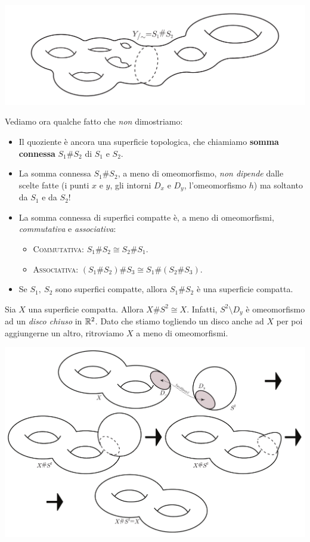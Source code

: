 \begin{center}
	\includegraphics[trim=0cm 0cm 0cm 0cm, clip, scale=0.4]{images/connectedsum3.pdf}
\end{center}
Vediamo ora qualche fatto che \textit{non} dimostriamo:
	\begin{itemize}
		\item Il quoziente è ancora una superficie topologica, che chiamiamo \textbf{somma connessa} $S_1\# S_2$  di $S_1$ e $S_2$.
		\item La somma connessa $S_1\# S_2$, a meno di omeomorfismo, \textit{non dipende} dalle scelte fatte (i punti $x$ e $y$, gli intorni $D_x$ e $D_y$, l'omeomorfismo $h$) ma soltanto da $S_1$ e da $S_2$!
		\item La somma connessa di superfici compatte è, a meno di omeomorfismi, \textit{commutativa} e \textit{associativa}:
		\begin{itemize}
			\item \textsc{Commutativa}: $S_1\# S_2\cong S_2\# S_1$.
			\item \textsc{Associativa}: $\left(S_1\# S_2\right)\# S_3\cong S_1\#\left(S_2\# S_3\right)$.
		\end{itemize}
	\item Se $S_1,\ S_2$ sono superfici compatte, allora $S_1\# S_2$ è una superficie compatta.
	\end{itemize}
\begin{observe}
	Sia $X$ una superficie compatta. Allora $X\# S^2\cong X$. Infatti, $S^2\setminus D_y$ è omeomorfismo ad un \textit{disco chiuso} in $\mathbb{R}^2$. Dato che stiamo togliendo un disco anche ad $X$ per poi aggiungerne un altro, ritroviamo $X$ a meno di omeomorfismi.
	\begin{center}
		\includegraphics[trim=0cm 0cm 0cm 0cm, clip, scale=0.4]{images/connectedsumsphere.pdf}
	\end{center}
\vspace{-6mm}
\end{observe}
